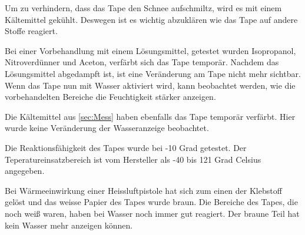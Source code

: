Um zu verhindern, dass das Tape den Schnee aufschmiltz, wird es mit einem Kältemittel gekühlt. Deswegen ist es wichtig abzuklären wie das Tape auf andere Stoffe reagiert.

Bei einer Vorbehandlung mit einem Lösungsmittel, getestet wurden Isopropanol, Nitroverdünner und Aceton, verfärbt sich das Tape temporär. Nachdem das Lösungsmittel abgedampft ist, ist eine Veränderung am Tape nicht mehr sichtbar. Wenn das Tape nun mit Wasser aktiviert wird, kann beobachtet werden, wie die vorbehandelten Bereiche die Feuchtigkeit stärker anzeigen.

Die Kältemittel aus \ref{sec:Mess} haben ebenfalls das Tape temporär verfärbt. Hier wurde keine Veränderung der Wasseranzeige beobachtet.

Die Reaktionsfähigkeit des Tapes wurde bei -10 Grad getestet. Der Teperatureinsatzbereich ist vom Hersteller als -40 bis 121 Grad Celsius angegeben.

Bei Wärmeeinwirkung einer Heissluftpistole hat sich zum einen der Klebstoff gelöst und das weisse Papier des Tapes wurde braun. Die Bereiche des Tapes, die noch weiß waren, haben bei Wasser noch immer gut reagiert. Der braune Teil hat kein Wasser mehr anzeigen können.
